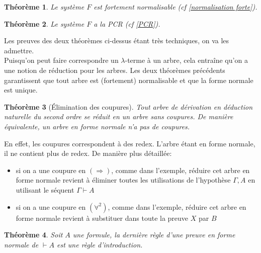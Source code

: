\documentclass[a4paper,12pt]{article}
\theoremstyle{plain}
\newtheorem{theo}{Théorème}[subsection]
\begin{document}
\begin{theo}
Le système $F$ est fortement normalisable (cf \ref{normalisation forte}).
\end{theo}

\begin{theo}
Le système $F$ a la PCR (cf \ref{PCR}).
\end{theo}

Les preuves des deux théorèmes ci-dessus étant très techniques, on va les admettre.\\

Puisqu'on peut faire correspondre un $\lambda$-terme à un arbre, cela entraîne qu'on a une notion de réduction pour les arbres. Les deux théorèmes précédents garantissent que tout arbre est (fortement) normalisable et que la forme normale est unique.

\begin{theo}[Élimination des coupures]
Tout arbre de dérivation en déduction naturelle du second ordre se réduit en un arbre sans coupures. De manière équivalente, un arbre en forme normale n'a pas de coupures.
\end{theo}

En effet, les coupures correspondent à des redex. L'arbre étant en forme normale, il ne contient plus de redex. De manière plus détaillée:

\begin{itemize}
\setlength\itemsep{ -1.5 em}
\item si on a une coupure en $(\Rightarrow)$, comme dans l'exemple, réduire cet arbre en forme normale revient à éliminer toutes les utilisations de l'hypothèse $\Gamma, A$ en utilisant le séquent $\Gamma \vdash A$\\
\item si on a une coupure en $(\forall^2)$, comme dans l'exemple, réduire cet arbre en forme normale revient à substituer dans toute la preuve $X$ par $B$
\end{itemize}

\begin{theo}
Soit $A$ une formule, la dernière règle d'une preuve en forme normale de $\vdash A$ est une règle d'introduction.
\end{theo}
\end{document}
